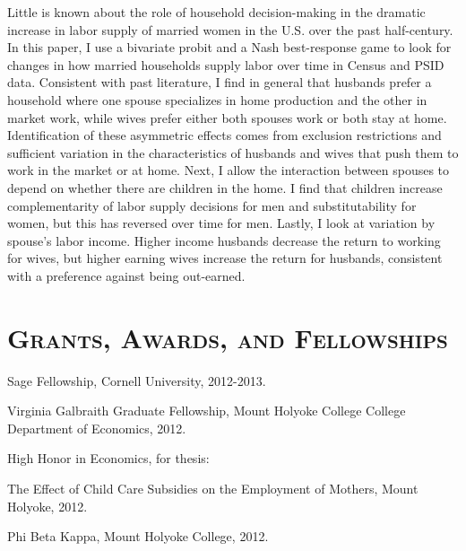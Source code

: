 \documentclass[10pt,letterpaper]{article}
\renewenvironment{itemize}{
  \begin{list}{}{
    \setlength{\leftmargin}{1.5em}
    \setlength{\itemsep}{0.25em}
    \setlength{\parskip}{0pt}
    \setlength{\parsep}{0.25em}
  }
}{
  \end{list}
}
\begin{document}
\begin{itemize}
\begin{itemize}
\item {Little is known about the role of household decision-making in the dramatic increase in labor supply of married women in the U.S. over the past half-century. In this paper, I use a bivariate probit and a Nash best-response game to look for changes in how married households supply labor over time in Census and PSID data. Consistent with past literature, I find in general that husbands prefer a household where one spouse specializes in home production and the other in market work, while wives prefer either both spouses work or both stay at home. Identification of these asymmetric effects comes from exclusion restrictions and sufficient variation in the characteristics of husbands and wives that push them to work in the market or at home. Next, I allow the interaction between spouses to depend on whether there are children in the home. I find that children increase complementarity of labor supply decisions for men and substitutability for women, but this has reversed over time for men. Lastly, I look at variation by spouse's labor income. Higher income husbands decrease the return to working for wives, but higher earning wives increase the return for husbands, consistent with a preference against being out-earned.}
\end{itemize}
\end{itemize}




\section*{\scshape Grants, Awards, and Fellowships}
\begin{itemize} 
  \item Sage Fellowship, Cornell University, 2012-2013.
  \item Virginia Galbraith Graduate Fellowship, Mount Holyoke College College Department of Economics, 2012.
  \item High Honor in Economics, for thesis: 
  
  \hfill{The Effect of Child Care Subsidies on the Employment of Mothers, Mount Holyoke, 2012.}
  \item Phi Beta Kappa, Mount Holyoke College, 2012.
\end{itemize}
\end{document}
